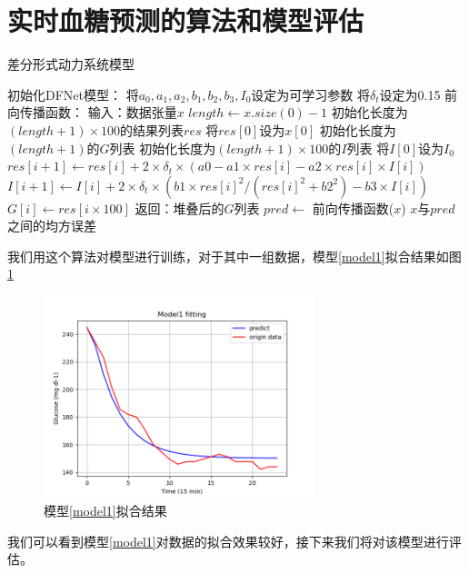 \section{实时血糖预测的算法和模型评估} 
\begin{algorithm}[H]
    \caption{差分形式动力系统模型}
    \begin{algorithmic}[1]
    \State 初始化DFNet模型：
    \State \quad 将$a_0, a_1, a_2, b_1, b_2, b_3, I_0$设定为可学习参数
    \State \quad 将$\delta_t$设定为0.15
    \State 前向传播函数：
    \State \quad 输入：数据张量$x$
    \State \quad $length \gets x.size(0) - 1$
    \State \quad 初始化长度为$(length + 1) \times 100$的结果列表$res$
    \State \quad 将$res[0]$设为$x[0]$
    \State \quad 初始化长度为$(length + 1)$的$G$列表
    \State \quad 初始化长度为$(length + 1) \times 100$的$I$列表
    \State \quad 将$I[0]$设为$I_0$
        \State $res[i + 1] \gets res[i] + 2 \times \delta_t \times (a0 - a1 \times res[i] - a2 \times res[i] \times I[i])$
        \State $I[i + 1] \gets I[i] + 2 \times \delta_t \times (b1 \times res[i]^2 / (res[i]^2 + b2^2) - b3 \times I[i])$
    \EndFor
        \State $G[i] \gets res[i \times 100]$
    \EndFor
    \State 返回：堆叠后的$G$列表
    \State
        \State $pred \gets$ 前向传播函数($x$)
        \State \Return $x$与$pred$之间的均方误差
    \EndFunction
    \end{algorithmic}
    \end{algorithm}
    我们用这个算法对模型进行训练，对于其中一组数据，模型\ref{model1}拟合结果如图\ref{fig:fit_1}
    \begin{figure}[H]
        \centering
        \includegraphics[width=0.7\textwidth]{Img/fit_1.png}
        \caption{模型\ref{model1}拟合结果}
        \label{fig:fit_1}
    \end{figure}
    我们可以看到模型\ref{model1}对数据的拟合效果较好，接下来我们将对该模型进行评估。

